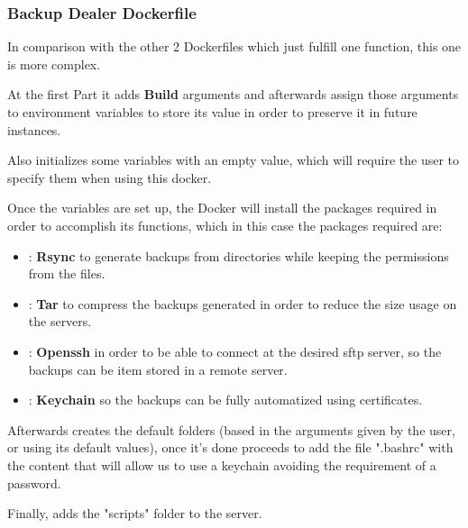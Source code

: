     \newpage
    \subsubsection[Backup Dealer Dockerfile]{Backup Dealer Dockerfile}
    
    \begin{flushleft}
        In comparison with the other 2 Dockerfiles which just fulfill one function, this one is more complex.
    \end{flushleft}
    \begin{flushleft}
        At the first Part it adds \textbf{Build} arguments and afterwards assign those arguments to environment variables
        to store its value in order to preserve it in future instances.

        Also initializes some variables with an empty value, which will require the user to specify them when using this docker.
    \end{flushleft}
    \begin{flushleft}
        Once the variables are set up, the Docker will install the packages required in order to accomplish its functions, which in this case the packages required are:
        \begin{itemize}
            \item : \textbf{Rsync} to generate backups from directories while keeping the permissions from the files.
            \item : \textbf{Tar} to compress the backups generated in order to reduce the size usage on the servers.
            \item : \textbf{Openssh} in order to be able to connect at the desired sftp server, so the backups can be
            item stored in a remote server.
            \item : \textbf{Keychain} so the backups can be fully automatized using certificates.
        \end{itemize}
    \end{flushleft}

    \begin{flushleft}
        Afterwards creates the default folders (based in the arguments given by the user, or using its default values),
        once it's done proceeds to add the file ".bashrc" with the content that will allow us to use a keychain avoiding the
        requirement of a password.
    \end{flushleft}
    \begin{flushleft}
        Finally, adds the "scripts" folder to the server.
    \end{flushleft}



